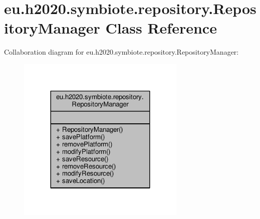 \hypertarget{classeu_1_1h2020_1_1symbiote_1_1repository_1_1RepositoryManager}{}\section{eu.\+h2020.\+symbiote.\+repository.\+Repository\+Manager Class Reference}
\label{classeu_1_1h2020_1_1symbiote_1_1repository_1_1RepositoryManager}


Collaboration diagram for eu.\+h2020.\+symbiote.\+repository.\+Repository\+Manager\+:
\nopagebreak
\begin{figure}[H]
\begin{center}
\leavevmode
\includegraphics[width=228pt]{classeu_1_1h2020_1_1symbiote_1_1repository_1_1RepositoryManager__coll__graph}
\end{center}
\end{figure}
